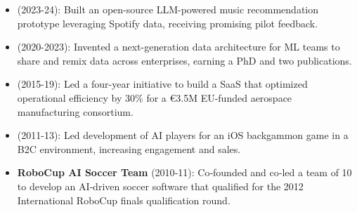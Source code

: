 \begin{itemize}


\item {} (2023-24): Built an open-source LLM-powered music recommendation prototype leveraging Spotify data, receiving promising pilot feedback.

\item {} (2020-2023): Invented a next-generation data architecture for ML teams to share and remix data across enterprises, earning a PhD and two publications.

\item {} (2015-19): Led a four-year initiative to build a SaaS that optimized operational efficiency by 30\% for a €3.5M EU-funded aerospace manufacturing consortium.

\item {} (2011-13): Led development of AI players for an iOS backgammon game in a B2C environment, increasing engagement and sales.

\item \textbf{RoboCup AI Soccer Team} (2010‑11): Co‑founded and co‑led a team of 10 to develop an AI‑driven soccer software that qualified for the 2012 International RoboCup finals qualification round.





\end{itemize}
